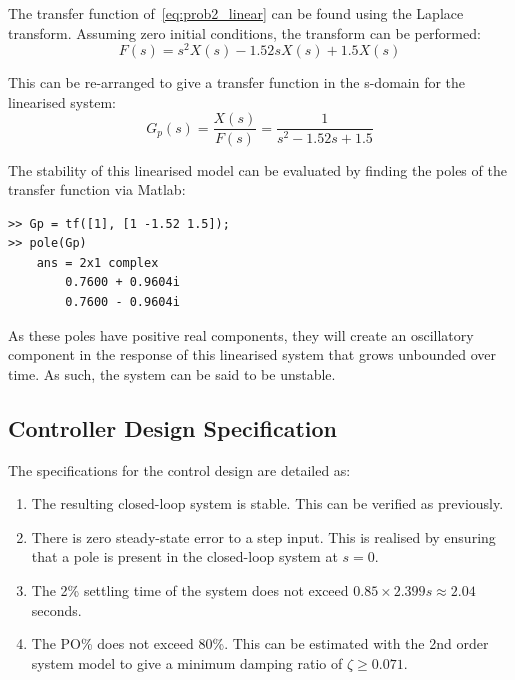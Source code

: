 \documentclass[conference,onecolumn,a4paper,11pt]{IEEEtran}
\begin{document}
The transfer function of~\eqref{eq:prob2_linear} can be found using the Laplace transform. Assuming zero initial conditions, the transform can be performed:
$$
F(s) = s^2X(s) - 1.52sX(s) + 1.5X(s)
$$

This can be re-arranged to give a transfer function in the s-domain for the linearised system: 
\begin{equation}
    G_p(s) = \frac{X(s)}{F(s)} = \frac{1}{s^2 - 1.52s + 1.5}
    \label{eq:prob2_plant_tf}
\end{equation}

The stability of this linearised model can be evaluated by finding the poles of the transfer function via Matlab:

\par\noindent\begin{minipage}{\linewidth}
\begin{lstlisting}[style=outputstyle]
>> Gp = tf([1], [1 -1.52 1.5]);
>> pole(Gp)
    ans = 2x1 complex
        0.7600 + 0.9604i
        0.7600 - 0.9604i
\end{lstlisting}
\end{minipage}\par
As these poles have positive real components, they will create an oscillatory component in the response of this linearised system that grows unbounded over time. As such, the system can be said to be unstable. 

\subsection{Controller Design Specification}
The specifications for the control design are detailed as:
\begin{enumerate}[label=\roman*., ref=\thesubsection(\roman*)]
    \item 
    The resulting closed-loop system is stable. This can be verified as previously.
    \label{spec:stability2}
    \item 
    There is zero steady-state error to a step input. This is realised
    by ensuring that a pole is present in the closed-loop system at $s=0$.
    \label{spec:sse2}
    \item 
    The 2\% settling time of the system does not exceed $0.85\times 2.399s \approx 2.04$ seconds.
    \label{spec:settling2}
    \item 
    The PO\% does not exceed 80\%. This can be estimated with the 2nd order system model to give a minimum damping ratio of $\zeta\geq0.071$.
    \label{spec:overshoot2}
\end{enumerate}
\end{document}
